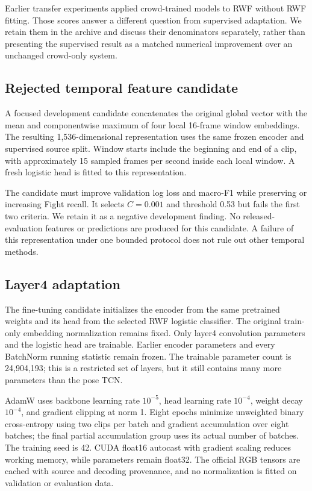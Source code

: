 \documentclass[journal]{IEEEtai}
\begin{document}
Earlier transfer experiments applied crowd-trained models to RWF without RWF fitting. Those scores answer a different question from supervised adaptation. We retain them in the archive and discuss their denominators separately, rather than presenting the supervised result as a matched numerical improvement over an unchanged crowd-only system.

\subsection{Rejected temporal feature candidate}
A focused development candidate concatenates the original global vector with the mean and componentwise maximum of four local 16-frame window embeddings. The resulting 1,536-dimensional representation uses the same frozen encoder and supervised source split. Window starts include the beginning and end of a clip, with approximately 15 sampled frames per second inside each local window. A fresh logistic head is fitted to this representation.

The candidate must improve validation log loss and macro-F1 while preserving or increasing Fight recall. It selects $C=0.001$ and threshold 0.53 but fails the first two criteria. We retain it as a negative development finding. No released-evaluation features or predictions are produced for this candidate. A failure of this representation under one bounded protocol does not rule out other temporal methods.

\subsection{Layer4 adaptation}
The fine-tuning candidate initializes the encoder from the same pretrained weights and its head from the selected RWF logistic classifier. The original train-only embedding normalization remains fixed. Only layer4 convolution parameters and the logistic head are trainable. Earlier encoder parameters and every BatchNorm running statistic remain frozen. The trainable parameter count is 24,904,193; this is a restricted set of layers, but it still contains many more parameters than the pose TCN.

AdamW \cite{loshchilov2019} uses backbone learning rate $10^{-5}$, head learning rate $10^{-4}$, weight decay $10^{-4}$, and gradient clipping at norm 1. Eight epochs minimize unweighted binary cross-entropy using two clips per batch and gradient accumulation over eight batches; the final partial accumulation group uses its actual number of batches. The training seed is 42. CUDA float16 autocast with gradient scaling reduces working memory, while parameters remain float32. The official RGB tensors are cached with source and decoding provenance, and no normalization is fitted on validation or evaluation data.
\end{document}
